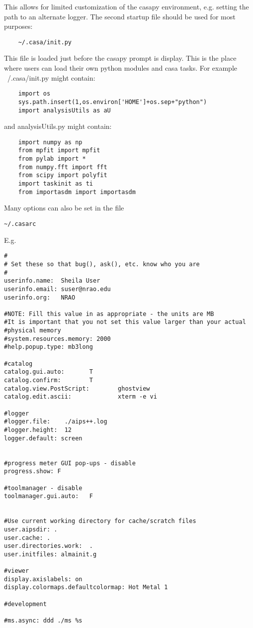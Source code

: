 This allows for limited customization of the casapy environment,
e.g. setting the path to an alternate logger. The second startup file
should be used for most purposes:

\small
\begin{verbatim}
	~/.casa/init.py
\end{verbatim}
\normalsize

This file is loaded just before the casapy prompt is display. This is the place where users can load their own python modules and casa tasks. For example ~/.casa/init.py might contain:

\small
\begin{verbatim}
	import os
	sys.path.insert(1,os.environ['HOME']+os.sep+"python")
	import analysisUtils as aU
\end{verbatim}
\normalsize

and analysisUtils.py might contain:

\small
\begin{verbatim}
	import numpy as np
	from mpfit import mpfit
	from pylab import *
	from numpy.fft import fft
	from scipy import polyfit
	import taskinit as ti
	from importasdm import importasdm
 \end{verbatim}
\normalsize


Many options can also be set in the file 


\small
\begin{verbatim}
~/.casarc
\end{verbatim}
\normalsize

E.g. 

\small
\begin{verbatim}
#
# Set these so that bug(), ask(), etc. know who you are
#
userinfo.name:  Sheila User
userinfo.email: suser@nrao.edu
userinfo.org:   NRAO

#NOTE: Fill this value in as appropriate - the units are MB
#It is important that you not set this value larger than your actual
#physical memory
#system.resources.memory: 2000
#help.popup.type: mb3long

#catalog
catalog.gui.auto:       T
catalog.confirm:        T
catalog.view.PostScript:        ghostview
catalog.edit.ascii:             xterm -e vi

#logger
#logger.file:    ./aips++.log
#logger.height:  12
logger.default: screen


#progress meter GUI pop-ups - disable
progress.show: F

#toolmanager - disable
toolmanager.gui.auto:   F


#Use current working directory for cache/scratch files
user.aipsdir: .
user.cache: .
user.directories.work:  .
user.initfiles: almainit.g

#viewer
display.axislabels: on
display.colormaps.defaultcolormap: Hot Metal 1

#development

#ms.async: ddd ./ms %s
\end{verbatim}
\normalsize

